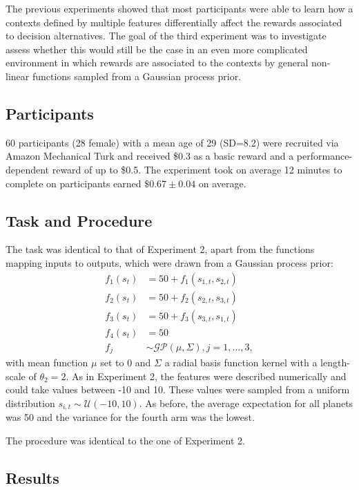 \documentclass[a4paper,natbib]{apa6}
\begin{document}
The previous experiments showed that most participants were able to learn how a contexts defined by multiple features differentially affect the rewards associated to decision alternatives. The goal of the third experiment was to investigate assess whether this would still be the case in an even more complicated environment in which rewards are associated to the contexts by general non-linear functions sampled from a Gaussian process prior. 

\subsection{Participants}
60 participants (28 female) with a mean age of 29 (SD=8.2) were recruited via Amazon Mechanical Turk and received \$0.3 as a basic reward and a performance-dependent reward of up to \$0.5. The experiment took on average 12 minutes to complete on participants earned $\$0.67\pm0.04$ on average.

\subsection{Task and Procedure}

The task was identical to that of Experiment 2, apart from the functions mapping inputs to outputs, which were drawn from a Gaussian process prior:
\begin{align*}
f_1(s_t) &= 50 + f_1(s_{1,t},s_{2,t}) \\
f_2(s_t) &= 50 + f_2(s_{2,t},s_{3,t}) \\
f_3(s_t) &= 50 + f_3(s_{3,t},s_{1,t}) \\
f_4(s_t) &= 50\\
f_j &\sim \mathcal{GP}(\mu, \Sigma), j=1,\ldots,3,
\end{align*}
%
with mean function $\mu$ set to 0 and $\Sigma$ a radial basis function kernel with a length-scale of $\theta_2=2$. As in Experiment 2, the features were described numerically and could take values between -10 and 10. These values were sampled from a uniform distribution $s_{i,t} \sim \mathcal{U}(-10,10)$. As before, the average expectation for all planets was 50 and the variance for the fourth arm was the lowest.

The procedure was identical to the one of Experiment 2.

\subsection{Results}
\end{document}
